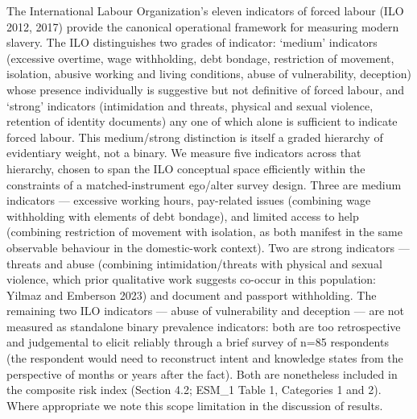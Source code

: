 \documentclass[
  12pt,
  letterpaper,
  DIV=11,
  numbers=noendperiod]{scrartcl}
\begin{document}
The International Labour Organization's eleven indicators of forced
labour (ILO 2012, 2017) provide the canonical operational framework for
measuring modern slavery. The ILO distinguishes two grades of indicator:
`medium' indicators (excessive overtime, wage withholding, debt bondage,
restriction of movement, isolation, abusive working and living
conditions, abuse of vulnerability, deception) whose presence
individually is suggestive but not definitive of forced labour, and
`strong' indicators (intimidation and threats, physical and sexual
violence, retention of identity documents) any one of which alone is
sufficient to indicate forced labour. This medium/strong distinction is
itself a graded hierarchy of evidentiary weight, not a binary. We
measure five indicators across that hierarchy, chosen to span the ILO
conceptual space efficiently within the constraints of a
matched-instrument ego/alter survey design. Three are medium indicators
--- excessive working hours, pay-related issues (combining wage
withholding with elements of debt bondage), and limited access to help
(combining restriction of movement with isolation, as both manifest in
the same observable behaviour in the domestic-work context). Two are
strong indicators --- threats and abuse (combining intimidation/threats
with physical and sexual violence, which prior qualitative work suggests
co-occur in this population: Yilmaz and Emberson 2023) and document and
passport withholding. The remaining two ILO indicators --- abuse of
vulnerability and deception --- are not measured as standalone binary
prevalence indicators: both are too retrospective and judgemental to
elicit reliably through a brief survey of n=85 respondents (the
respondent would need to reconstruct intent and knowledge states from
the perspective of months or years after the fact). Both are nonetheless
included in the composite risk index (Section 4.2; ESM\_1 Table 1,
Categories 1 and 2). Where appropriate we note this scope limitation in
the discussion of results.
\end{document}

